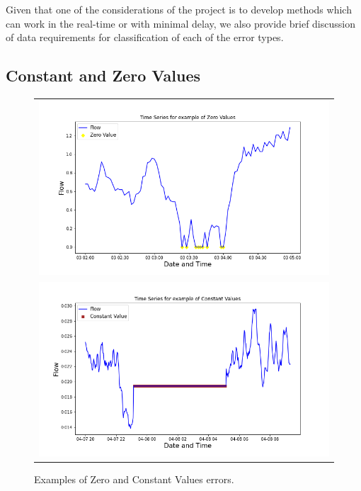 \documentclass[12pt,a4paper]{article}
\begin{document}
Given that one of the considerations of the project is to develop methods which can work in the real-time or with minimal delay, we also provide brief discussion of data requirements for classification of each of the error types.



\subsection{Constant and Zero Values}

\begin{figure}[htbp]
    \centering
    \begin{tabular}{c}
        \includegraphics[width=0.99\linewidth]{zeros_ex.png} \\
        \includegraphics[width=0.99\linewidth]{const_ex.png} \\
    \end{tabular}
    \caption{Examples of Zero and Constant Values errors.}
    \label{fig:zero_const_ex}
\end{figure}
\end{document}
